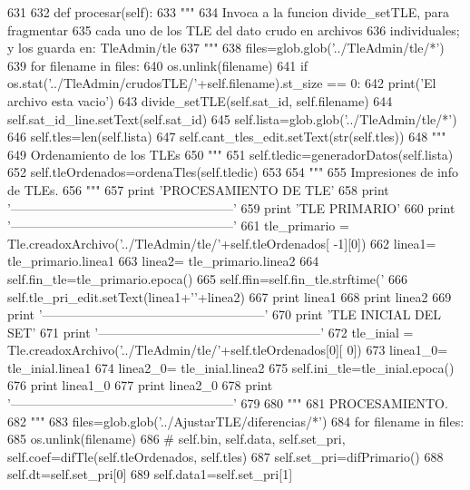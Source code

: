 \begin{DoxyCode}
631 
632     def procesar(self):
633         """
634         Invoca a la funcion divide_setTLE, para fragmentar
635         cada uno de los TLE del dato crudo en archivos
636         individuales; y los guarda en: TleAdmin/tle
637         """
638         files=glob.glob('../TleAdmin/tle/*')
639         for filename in files:
640             os.unlink(filename)
641         if os.stat('../TleAdmin/crudosTLE/'+self.filename).st_size == 0:
642             print('El archivo esta vacio')
643         divide_setTLE(self.sat_id, self.filename)
644         self.sat_id_line.setText(self.sat_id)
645         self.lista=glob.glob('../TleAdmin/tle/*')
646         self.tles=len(self.lista)
647         self.cant_tles_edit.setText(str(self.tles))
648         """
649         Ordenamiento de los TLEs
650         """
651         self.tledic=generadorDatos(self.lista)
652         self.tleOrdenados=ordenaTles(self.tledic)
653 
654         """
655         Impresiones de info de TLEs.
656         """
657         print 'PROCESAMIENTO DE TLE'
658         print '-----------------------------------------------------'
659         print 'TLE PRIMARIO'
660         print '-----------------------------------------------------'
661         tle_primario = Tle.creadoxArchivo('../TleAdmin/tle/'+self.tleOrdenados[
      -1][0])
662         linea1= tle_primario.linea1
663         linea2= tle_primario.linea2
664         self.fin_tle=tle_primario.epoca()
665         self.ffin=self.fin_tle.strftime('%
666         self.tle_pri_edit.setText(linea1+'\n'+linea2)
667         print linea1
668         print linea2
669         print '-----------------------------------------------------'
670         print 'TLE INICIAL DEL SET'
671         print '-----------------------------------------------------'
672         tle_inial = Tle.creadoxArchivo('../TleAdmin/tle/'+self.tleOrdenados[0][
      0])
673         linea1_0= tle_inial.linea1
674         linea2_0= tle_inial.linea2
675         self.ini_tle=tle_inial.epoca()
676         print linea1_0
677         print linea2_0
678         print '-----------------------------------------------------'
679         
680         """
681         PROCESAMIENTO.
682         """
683         files=glob.glob('../AjustarTLE/diferencias/*')
684         for filename in files:
685             os.unlink(filename)
686 #        self.bin, self.data, self.set_pri, self.coef=difTle(self.tleOrdenados,
       self.tles)
687         self.set_pri=difPrimario()
688         self.dt=self.set_pri[0]
689         self.data1=self.set_pri[1]

\end{DoxyCode}
